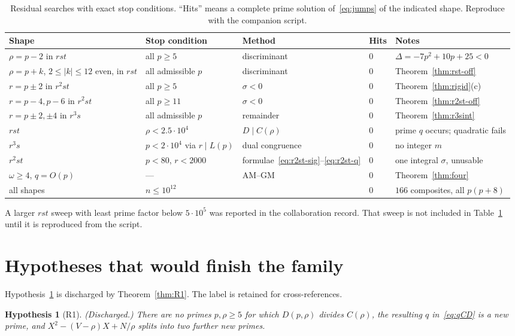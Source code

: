 \documentclass[11pt,reqno]{amsart}
\theoremstyle{definition}
\newtheorem{hypothesis}[theorem]{Hypothesis}
\begin{document}
\begin{table}[ht]
\centering
\caption{Residual searches with exact stop conditions. ``Hits'' means a complete prime solution of~\eqref{eq:jumps} of the indicated shape. Reproduce with the companion script.}
\label{tab:bounds}
{\small
\begin{tabular}{@{}lllll@{}}
\toprule
Shape & Stop condition & Method & Hits & Notes \\
\midrule
\(\rho=p-2\) in \(rst\) & all \(p\ge 5\) & discriminant & \(0\) & \(\Delta=-7p^2+10p+25<0\) \\
\(\rho=p+k\), \(2\le |k|\le 12\) even, in \(rst\) & all admissible \(p\) & discriminant & \(0\) & Theorem~\ref{thm:rst-off} \\
\(r=p\pm 2\) in \(r^2st\) & all \(p\ge 5\) & \(\sigma<0\) & \(0\) & Theorem~\ref{thm:rigid}(c) \\
\(r=p-4,p-6\) in \(r^2st\) & all \(p\ge 11\) & \(\sigma<0\) & \(0\) & Theorem~\ref{thm:r2st-off} \\
\(r=p\pm 2,\pm 4\) in \(r^3s\) & all admissible \(p\) & remainder & \(0\) & Theorem~\ref{thm:r3sint} \\
\(rst\) & \(\rho<2.5\cdot 10^4\) & \(D\mid C(\rho)\) & \(0\) & prime \(q\) occurs; quadratic fails \\
\(r^3s\) & \(p<2\cdot 10^4\) via \(r\mid L(p)\) & dual congruence & \(0\) & no integer \(m\) \\
\(r^2st\) & \(p<80\), \(r<2000\) & formulae~\eqref{eq:r2st-sig}--\eqref{eq:r2st-q} & \(0\) & one integral \(\sigma\), unusable \\
\(\omega\ge 4\), \(q=O(p)\) & --- & AM--GM & \(0\) & Theorem~\ref{thm:four} \\
all shapes & \(n\le 10^{12}\) & \cite{RCW2026} & \(0\) & \(166\) composites, all \(p(p+8)\) \\
\bottomrule
\end{tabular}
}
\end{table}

A larger \(rst\) sweep with least prime factor below \(5\cdot 10^5\) was reported in the collaboration record. That sweep is not included in Table~\ref{tab:bounds} until it is reproduced from the script.

\section{Hypotheses that would finish the family}
\label{sec:conj}

Hypothesis~\ref{hyp:R1} is discharged by Theorem~\ref{thm:R1}. The label is retained for cross-references.
\begin{hypothesis}[R1]
\label{hyp:R1}
\itshape (Discharged.) There are no primes \(p,\rho\ge 5\) for which \(D(p,\rho)\) divides \(C(\rho)\), the resulting \(q\) in~\eqref{eq:qCD} is a new prime, and \(X^2-(V-\rho)X+N/\rho\) splits into two further new primes.
\end{hypothesis}
\end{document}
